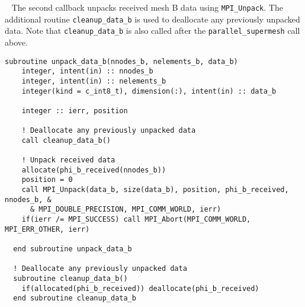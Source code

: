 \documentclass{article}
\begin{document}
~\newline
The second callback unpacks received mesh B data using \verb+MPI_Unpack+. The
additional routine \verb+cleanup_data_b+ is used to deallocate any previously
unpacked data. Note that \verb+cleanup_data_b+ is also called after the
\verb+parallel_supermesh+ call above.
\begin{lstlisting}[language=FORTRAN] 
  subroutine unpack_data_b(nnodes_b, nelements_b, data_b)
    integer, intent(in) :: nnodes_b
    integer, intent(in) :: nelements_b
    integer(kind = c_int8_t), dimension(:), intent(in) :: data_b

    integer :: ierr, position

    ! Deallocate any previously unpacked data
    call cleanup_data_b()

    ! Unpack received data
    allocate(phi_b_received(nnodes_b))
    position = 0
    call MPI_Unpack(data_b, size(data_b), position, phi_b_received, nnodes_b, &
      & MPI_DOUBLE_PRECISION, MPI_COMM_WORLD, ierr)
    if(ierr /= MPI_SUCCESS) call MPI_Abort(MPI_COMM_WORLD, MPI_ERR_OTHER, ierr)

  end subroutine unpack_data_b 

  ! Deallocate any previously unpacked data
  subroutine cleanup_data_b()
    if(allocated(phi_b_received)) deallocate(phi_b_received)
  end subroutine cleanup_data_b
\end{lstlisting}
\end{document}
